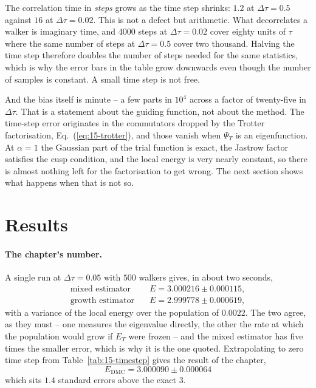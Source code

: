 The correlation time in \emph{steps} grows as the time step shrinks: $1.2$ at
$\Delta\tau=0.5$ against $16$ at $\Delta\tau=0.02$.  This is not a defect but
arithmetic.  What decorrelates a walker is imaginary time, and $4000$ steps at
$\Delta\tau=0.02$ cover eighty units of $\tau$ where the same number of steps
at $\Delta\tau=0.5$ cover two thousand.  Halving the time step therefore
doubles the number of steps needed for the same statistics, which is why the
error bars in the table grow downwards even though the number of samples is
constant.  A small time step is not free.

And the bias itself is minute -- a few parts in $10^{4}$ across a factor of
twenty-five in $\Delta\tau$.  That is a statement about the guiding function,
not about the method.  The time-step error originates in the commutators
dropped by the Trotter factorisation, Eq.~(\ref{eq:15-trotter}), and those
vanish when $\Psi_T$ is an eigenfunction.  At $\alpha=1$ the Gaussian part of
the trial function is exact, the Jastrow factor satisfies the cusp condition,
and the local energy is very nearly constant, so there is almost nothing left
for the factorisation to get wrong.  The next section shows what happens when
that is not so.

\section{Results}
\label{sec:dmcresults}

\paragraph{The chapter's number.}
A single run at $\Delta\tau=0.05$ with $500$ walkers gives, in about two
seconds,
\begin{align*}
  \text{mixed estimator} \quad&E = 3.000216 \pm 0.000115,\\
  \text{growth estimator}\quad&E = 2.999778 \pm 0.000619,
\end{align*}
with a variance of the local energy over the population of $0.0022$.  The two
agree, as they must -- one measures the eigenvalue directly, the other the
rate at which the population would grow if $E_T$ were frozen -- and the mixed
estimator has five times the smaller error, which is why it is the one
quoted.  Extrapolating to zero time step from Table~\ref{tab:15-timestep}
gives the result of the chapter,
\begin{equation}
  \boxed{\;E_{\mathrm{DMC}} = 3.000090 \pm 0.000064\;}
  \label{eq:15-final}
\end{equation}
which sits $1.4$ standard errors above the exact $3$.

